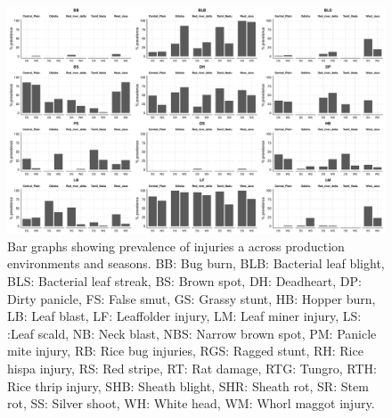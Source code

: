     \begin{landscape}
\begin{figure}
\centering
\includegraphics[height = 1\textwidth]{figures/barplot1.pdf}
\caption{Bar graphs showing  prevalence of injuries a across production environments and seasons. BB: Bug burn, BLB: Bacterial leaf blight, BLS: Bacterial leaf streak, BS: Brown spot, DH: Deadheart, DP: Dirty panicle, FS: False smut, GS: Grassy stunt, HB: Hopper burn, LB: Leaf blast, LF: Leaffolder injury, LM: Leaf miner injury, LS: :Leaf scald, NB: Neck blast, NBS:  Narrow brown spot, PM: Panicle mite injury, RB: Rice bug injuries, RGS: Ragged stunt, RH: Rice hispa injury, RS: Red stripe, RT: Rat damage, RTG: Tungro, RTH: Rice thrip injury, SHB: Sheath blight, SHR: Sheath rot, SR: Stem rot, SS: Silver shoot, WH: White head, WM: Whorl maggot injury.}\end{figure}    \end{landscape} 
    
